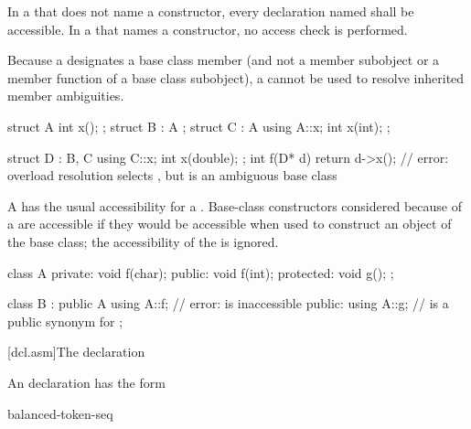 \pnum
{}%
In a  that does not name a constructor,
every declaration named shall be accessible.
In a  that names a constructor,
no access check is performed.

\pnum
\begin{note}
Because a  designates a base class member
(and not a member subobject or a member function of a base class
subobject), a  cannot be used to resolve
inherited member ambiguities.
\begin{example}
\begin{codeblock}
struct A { int x(); };
struct B : A { };
struct C : A {
  using A::x;
  int x(int);
};

struct D : B, C {
  using C::x;
  int x(double);
};
int f(D* d) {
  return d->x();    // error: overload resolution selects , but  is an ambiguous base class
}
\end{codeblock}
\end{example}
\end{note}

\pnum
A  has the usual
accessibility for a .
Base-class constructors considered because of a 
are accessible if they would be accessible
when used to construct an object of the base class;
the accessibility of the  is ignored.
\begin{example}
\begin{codeblock}
class A {
private:
    void f(char);
public:
    void f(int);
protected:
    void g();
};

class B : public A {
  using A::f;       // error:  is inaccessible
public:
  using A::g;       //  is a public synonym for 
};
\end{codeblock}
\end{example}


[dcl.asm]{The  declaration}%
%
%

\pnum
An  declaration has the form
\begin{bnf}
\br
      \terminal{(} balanced-token-seq \terminal{)} \terminal{;}
\end{bnf}

